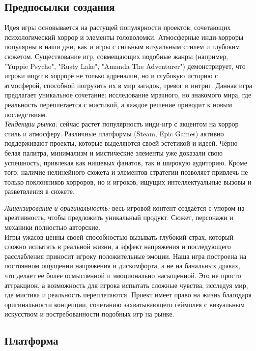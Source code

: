 \documentclass{article}
\begin{document}
	\newpage
	\subsection{Предпосылки создания}
	
	Идея игры основывается на растущей популярности проектов, сочетающих психологический хоррор и элементы головоломки. Атмосферные инди-хорроры популярны в наши дни, как и игры с сильным визуальным стилем и глубоким сюжетом. Существование игр, совмещающих подобные жанры (например, "Yuppie Psycho", "Rusty Lake", "Amanda The Adventurer") демонстрирует, что игроки ищут в хорроре не только адреналин, но и глубокую историю с атмосферой, способной погрузить их в мир загадок, тревог и интриг. Данная игра предлагает уникальное сочетание: исследование мрачного, но знакомого мира, где реальность переплетается с мистикой, а каждое решение приводит к новым последствиям. \\
	
	\textit{Тенденции рынка:} сейчас растет популярность инди-игр с акцентом на хоррор стиль и атмосферу. Различные платформы (Steam, Epic Games) активно поддерживают проекты, которые выделяются своей эстетикой и идеей. Чёрно-белая палитра, минимализм и мистические элементы уже доказали свою успешность, привлекая как нишевых фанатов, так и широкую аудиторию. Кроме того, наличие нелинейного сюжета и элементов стратегии позволяет привлечь не только поклонников хорроров, но и игроков, ищущих интеллектуальные вызовы и разветвления в сюжете.
	
	\textit{Лицензирование и оригинальность:} весь игровой контент создаётся с упором на креативность, чтобы предложить уникальный продукт. Сюжет, персонажи и механики полностью авторские. \\
	
	Игры ужасов ценны своей способностью вызывать глубокий страх, который сложно испытать в реальной жизни, а эффект напряжения и последующего расслабления приносит игроку положительные эмоции. Наша игра построена на постоянном ощущении напряжения и дискомфорта, а не на банальных драках, что делает ее более осмысленной и эмоционально насыщенной. Это не просто аттракцион, а возможность для игрока испытать сложные чувства, исследуя мир, где мистика и реальность переплетаются. Проект имеет право на жизнь благодаря оригинальности концепции, сочетанию захватывающего геймплея с визуальным искусством и востребованности подобных игр на рынке.

	\newpage
	\subsection{Платформа}
	
\end{document}
